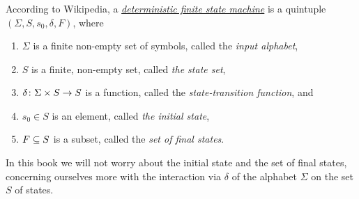 \begin{exampleRUS}\label{ex:monoid as olog}
\end{exampleRUS}


\subsubsection{}\label{sec:FSMs}

\begin{blockENG}
According to Wikipedia, a \href{http://en.wikipedia.org/wiki/Finite_state_machine#Mathematical_model}{\em deterministic finite state machine} is a quintuple $(\Sigma,S,s_0,\delta,F)$, where
\begin{enumerate}
\item $\Sigma$ is a finite non-empty set of symbols, called the {\em input alphabet},
\item $S$ is a finite, non-empty set, called {\em the state set},
\item $\delta\taking \Sigma\times S\to S$ is a function, called the {\em state-transition function}, and
\item $s_0\in S$ is an element, called {\em the initial state},
\item $F\ss S$ is a subset, called the {\em set of final states}.
\end{enumerate}
\end{blockENG}

\begin{blockRUS}
\end{blockRUS}

\begin{blockENG}
In this book we will not worry about the initial state and the set of final states, concerning ourselves more with the interaction via $\delta$ of the alphabet $\Sigma$ on the set $S$ of states.
\end{blockENG}

\begin{blockRUS}
\end{blockRUS}

